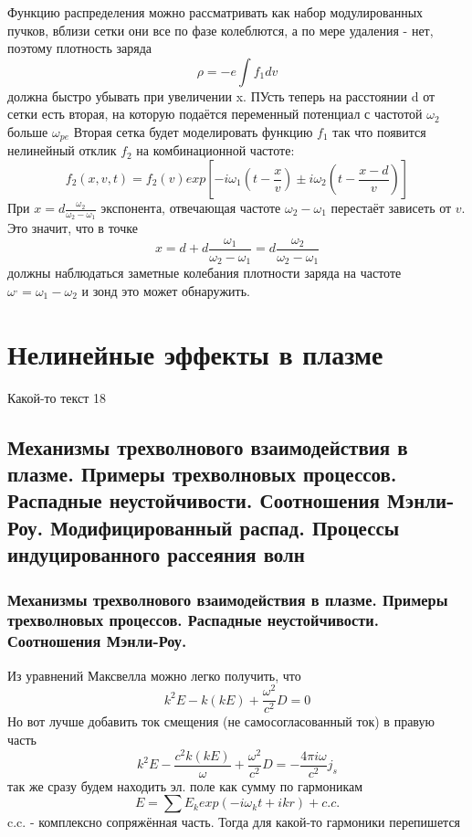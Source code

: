 \documentclass[10pt, a4paper]{article}
\let\stdsection\section
\renewcommand\section{\newpage\stdsection}
\begin{document}
Функцию распределения можно рассматривать как набор модулированных пучков, вблизи сетки они все по фазе колеблются, а по мере удаления - нет, поэтому плотность заряда
\begin{equation}
	\rho = -e \int f_1 dv
\end{equation}
должна быстро убывать при увеличении x.
ПУсть теперь на расстоянии d от сетки есть вторая, на которую подаётся переменный потенциал с частотой $\omega_2$ больше $\omega_{pe}$
Вторая сетка будет моделировать функцию $f_1$ так что появится нелинейный отклик $f_2$ на комбинационной частоте:
\begin{equation}
	f_2 (x,v,t)=f_2 (v) exp[-i \omega_1 (t-\frac{x}{v}) \pm i \omega_2 (t- \frac{x-d}{v})]
\end{equation}
При $x=d\frac{\omega_2}{\omega_2-\omega_1}$ экспонента, отвечающая частоте $\omega_2-\omega_1$ перестаёт зависеть от $v$. Это значит, что в точке
\begin{equation}
	x=d+d \frac{\omega_1}{\omega_2-\omega_1}=d  \frac{\omega_2}{\omega_2-\omega_1}
\end{equation}
должны наблюдаться заметные колебания плотности заряда на частоте $\omega^{,} = \omega_1-\omega_2 $ и зонд это может обнаружить.


\section{Нелинейные эффекты в плазме}

Какой-то текст 18

\subsection{Механизмы трехволнового взаимодействия в плазме. Примеры трехволновых процессов. Распадные неустойчивости. Соотношения Мэнли-Роу. Модифицированный распад. Процессы индуцированного рассеяния волн}

\subsubsection{Механизмы трехволнового взаимодействия в плазме. Примеры трехволновых процессов. Распадные неустойчивости. Соотношения Мэнли-Роу.}

Из уравнений Максвелла можно легко получить, что
\begin{equation}
	k^2 E - k (kE)+\frac{\omega^2}{c^2} D =0
\end{equation}
Но вот лучше добавить ток смещения (не самосогласованный ток) в правую часть
\begin{equation}
	k^2 E - \frac{c^2 k (kE)}{\omega}+\frac{\omega^2}{c^2} D =-\frac{4 \pi i \omega}{c^2} j_{s}
\end{equation}
так же сразу будем находить эл. поле как сумму по гармоникам
\begin{equation}
	E=\sum E_k exp(-i \omega_k t + ikr) + c.c.
\end{equation}
c.c. - комплексно сопряжённая часть.
Тогда для какой-то гармоники перепишется 
\end{document}

